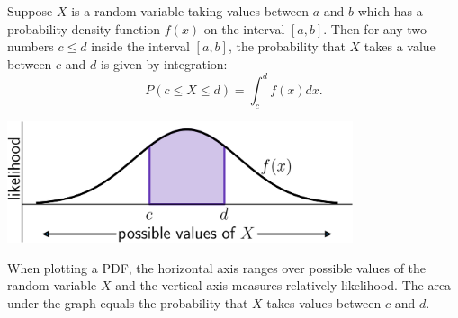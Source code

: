 \documentclass{ximera}
\begin{document}
\begin{definition}
Suppose $X$ is a random variable taking values between $a$ and $b$ which has a probability density function $f(x)$ on the interval $[a,b]$.
 Then for any two numbers $c \leq d$ inside the interval $[a,b]$, the probability that $X$ takes a value between $c$ and $d$ is given by integration:
 \[ P( c \leq X \leq d) = \int_c^d f(x) dx. \]
 \begin{center}
 \begin{image}
 \includegraphics[width=4in]{probability01.png}
 \end{image}
 {\footnotesize When plotting a PDF, the horizontal axis ranges over possible values of the random variable $X$ and the vertical axis measures relatively likelihood. The area under the graph equals the probability that $X$ takes values between $c$ and $d$.}
 \end{center}
 \end{definition}
\end{document}
